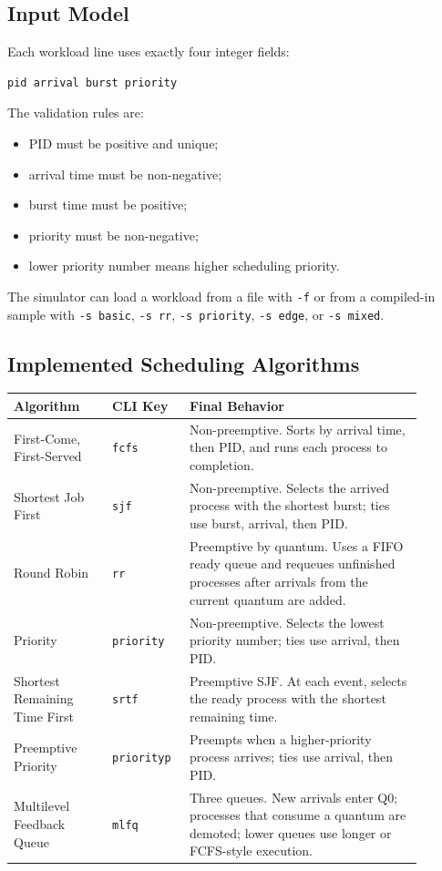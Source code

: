 \documentclass[11pt]{article}
\begin{document}
\subsection{Input Model}

Each workload line uses exactly four integer fields:

\begin{lstlisting}[style=code]
pid arrival burst priority
\end{lstlisting}

The validation rules are:

\begin{itemize}
  \item PID must be positive and unique;
  \item arrival time must be non-negative;
  \item burst time must be positive;
  \item priority must be non-negative;
  \item lower priority number means higher scheduling priority.
\end{itemize}

The simulator can load a workload from a file with \texttt{-f} or from a
compiled-in sample with \texttt{-s basic}, \texttt{-s rr},
\texttt{-s priority}, \texttt{-s edge}, or \texttt{-s mixed}.

\subsection{Implemented Scheduling Algorithms}

\begin{longtable}{p{0.22\linewidth}p{0.15\linewidth}p{0.52\linewidth}}
\toprule
\textbf{Algorithm} & \textbf{CLI Key} & \textbf{Final Behavior} \\
\midrule
First-Come, First-Served & \texttt{fcfs} & Non-preemptive. Sorts by arrival
time, then PID, and runs each process to completion. \\
Shortest Job First & \texttt{sjf} & Non-preemptive. Selects the arrived
process with the shortest burst; ties use burst, arrival, then PID. \\
Round Robin & \texttt{rr} & Preemptive by quantum. Uses a FIFO ready queue and
requeues unfinished processes after arrivals from the current quantum are
added. \\
Priority & \texttt{priority} & Non-preemptive. Selects the lowest priority
number; ties use arrival, then PID. \\
Shortest Remaining Time First & \texttt{srtf} & Preemptive SJF. At each event,
selects the ready process with the shortest remaining time. \\
Preemptive Priority & \texttt{priorityp} & Preempts when a higher-priority
process arrives; ties use arrival, then PID. \\
Multilevel Feedback Queue & \texttt{mlfq} & Three queues. New arrivals enter
Q0; processes that consume a quantum are demoted; lower queues use longer or
FCFS-style execution. \\
\bottomrule
\end{longtable}
\end{document}
